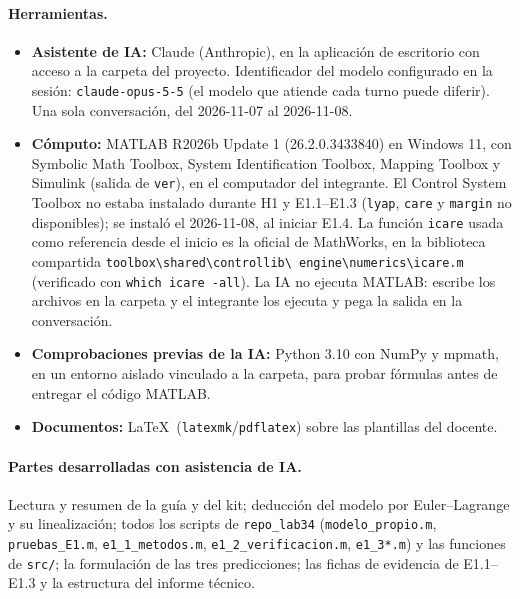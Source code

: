 \documentclass[11pt,a4paper]{article}
\begin{document}
\paragraph{Herramientas.}
\begin{itemize}
\item \textbf{Asistente de IA:} Claude (Anthropic), en la aplicación de escritorio con acceso a la carpeta
  del proyecto. Identificador del modelo configurado en la sesión: \texttt{claude-opus-5-5}
  (el modelo que atiende cada turno puede diferir). Una sola conversación, del 2026-11-07 al 2026-11-08.
\item \textbf{Cómputo:} MATLAB R2026b Update 1 (26.2.0.3433840) en Windows 11, con Symbolic Math Toolbox,
  System Identification Toolbox, Mapping Toolbox y Simulink (salida de \texttt{ver}), en el computador del
  integrante. El Control System Toolbox no estaba instalado durante H1 y E1.1--E1.3 (\texttt{lyap},
  \texttt{care} y \texttt{margin} no disponibles); se instaló el 2026-11-08, al iniciar E1.4. La función
  \texttt{icare} usada como referencia desde el inicio es la oficial de MathWorks, en la
  biblioteca compartida \texttt{toolbox\textbackslash shared\textbackslash controllib\textbackslash
  engine\textbackslash numerics\textbackslash icare.m} (verificado con \texttt{which icare -all}). La IA no ejecuta MATLAB: escribe los
  archivos en la carpeta y el integrante los ejecuta y pega la salida en la conversación.
\item \textbf{Comprobaciones previas de la IA:} Python 3.10 con NumPy y mpmath, en un entorno aislado
  vinculado a la carpeta, para probar fórmulas antes de entregar el código MATLAB.
\item \textbf{Documentos:} \LaTeX\ (\texttt{latexmk}/\texttt{pdflatex}) sobre las plantillas del docente.
\end{itemize}

\paragraph{Partes desarrolladas con asistencia de IA.}
Lectura y resumen de la guía y del kit; deducción del modelo por Euler--Lagrange y su linealización;
todos los scripts de \texttt{repo\_lab34} (\texttt{modelo\_propio.m}, \texttt{pruebas\_E1.m},
\texttt{e1\_1\_metodos.m}, \texttt{e1\_2\_verificacion.m}, \texttt{e1\_3*.m}) y las funciones de
\texttt{src/}; la formulación de las tres predicciones; las fichas de evidencia de E1.1--E1.3 y la
estructura del informe técnico.
\end{document}
